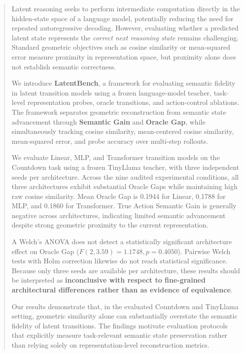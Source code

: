 \documentclass[conference]{IEEEtran}
\begin{document}
\begin{abstract}
Latent reasoning seeks to perform intermediate computation directly in the hidden-state space of a language model, potentially reducing the need for repeated autoregressive decoding. However, evaluating whether a predicted latent state represents the \textit{correct next reasoning state} remains challenging. Standard geometric objectives such as cosine similarity or mean-squared error measure proximity in representation space, but proximity alone does not establish semantic correctness.

We introduce \textbf{LatentBench}, a framework for evaluating semantic fidelity in latent transition models using a frozen language-model teacher, task-level representation probes, oracle transitions, and action-control ablations. The framework separates geometric reconstruction from semantic state advancement through \textbf{Semantic Gain} and \textbf{Oracle Gap}, while simultaneously tracking cosine similarity, mean-centered cosine similarity, mean-squared error, and probe accuracy over multi-step rollouts.

We evaluate Linear, MLP, and Transformer transition models on the Countdown task using a frozen TinyLlama teacher, with three independent seeds per architecture. Across the nine audited experimental conditions, all three architectures exhibit substantial Oracle Gaps while maintaining high raw cosine similarity. Mean Oracle Gap is 0.1944 for Linear, 0.1788 for MLP, and 0.1860 for Transformer. True Action Semantic Gain is generally negative across architectures, indicating limited semantic advancement despite strong geometric proximity to the current representation.

A Welch's ANOVA does not detect a statistically significant architecture effect on Oracle Gap ($F(2,3.59)=1.1748, p=0.4050$). Pairwise Welch tests with Holm correction likewise do not reach statistical significance. Because only three seeds are available per architecture, these results should be interpreted as \textbf{inconclusive with respect to fine-grained architectural differences rather than as evidence of equivalence}.

Our results demonstrate that, in the evaluated Countdown and TinyLlama setting, geometric similarity alone can substantially overstate the semantic fidelity of latent transitions. The findings motivate evaluation protocols that explicitly measure task-relevant semantic state preservation rather than relying solely on representation-level reconstruction metrics.
\end{abstract}
\end{document}
